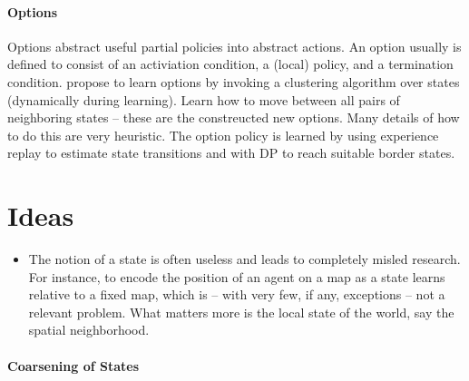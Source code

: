 \documentclass{article}
\begin{document}
\paragraph{Options \cite{mannor2004dynamic}} Options abstract useful partial policies into abstract actions. An option usually is defined to consist of an activiation condition, a (local) policy, and a termination condition. \cite{mannor2004dynamic} propose to learn options by invoking a clustering algorithm over states (dynamically during learning). Learn how to move between all pairs of neighboring states -- these are the constreucted new options. Many details of how to do this are very heuristic. The option policy is learned by using experience replay to estimate state transitions and with DP to reach suitable border states. 

\paragraph{\cite{kulkarni2016hierarchical}}

\paragraph{\cite{vezhnevets2016strategic}}

\paragraph{\cite{florensa2017stochastic}}

\section{Ideas}

\begin{itemize}
\item The notion of a state is often useless and leads to completely misled research. For instance, to encode the position of an agent on a map as a state learns relative to a fixed map, which is -- with very few, if any, exceptions -- not a relevant problem. What matters more is the local state of the world, say the spatial neighborhood. 
\end{itemize}


\newpage

\paragraph{Coarsening of States}
\end{document}
